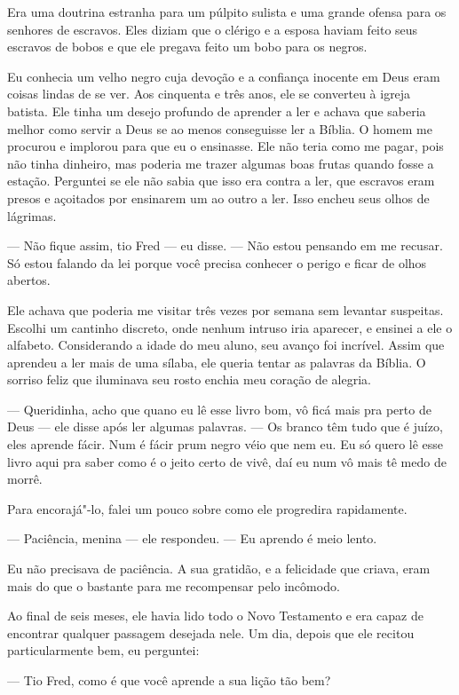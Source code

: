 Era uma doutrina estranha para um púlpito sulista e uma grande ofensa
para os senhores de escravos. Eles diziam que o clérigo e a esposa
haviam feito seus escravos de bobos e que ele pregava feito um bobo para
os negros.

Eu conhecia um velho negro cuja devoção
e a confiança inocente em Deus eram coisas lindas de se ver. Aos
cinquenta e três anos, ele se converteu à igreja batista. Ele tinha um
desejo profundo de aprender a ler e achava que saberia melhor como
servir a Deus se ao menos conseguisse ler a Bíblia. O homem me procurou
e implorou para que eu o ensinasse. Ele não teria como me pagar, pois
não tinha dinheiro, mas poderia me trazer algumas boas frutas quando
fosse a estação. Perguntei se ele não sabia que isso era contra a ler,
que escravos eram presos e açoitados por ensinarem um ao outro a ler.
Isso encheu seus olhos de lágrimas.

--- Não fique assim, tio Fred --- eu disse. --- Não estou pensando em me
recusar. Só estou falando da lei porque você precisa conhecer o perigo e
ficar de olhos abertos.

Ele achava que poderia me visitar três vezes por semana sem levantar
suspeitas. Escolhi um cantinho discreto, onde nenhum intruso iria
aparecer, e ensinei a ele o alfabeto. Considerando a idade do meu aluno,
seu avanço foi incrível. Assim que aprendeu a ler mais de uma sílaba,
ele queria tentar as palavras da Bíblia. O sorriso feliz que iluminava
seu rosto enchia meu coração de alegria.

--- Queridinha, acho que quano eu lê esse livro bom, vô ficá mais pra
perto de Deus --- ele disse após ler algumas palavras. --- Os branco têm
tudo que é juízo, eles aprende fácir. Num é fácir prum negro véio que
nem eu. Eu só quero lê esse livro aqui pra saber como é o jeito certo de
vivê, daí eu num vô mais tê medo de morrê.

Para encorajá"-lo, falei um pouco sobre
como ele progredira rapidamente.

--- Paciência, menina --- ele respondeu. --- Eu aprendo é meio lento.

Eu não precisava de paciência. A sua
gratidão, e a felicidade que criava, eram mais do que o bastante para me
recompensar pelo incômodo.

Ao final de seis meses, ele havia lido
todo o Novo Testamento e era capaz de encontrar qualquer passagem
desejada nele. Um dia, depois que ele recitou particularmente bem, eu
perguntei:

--- Tio Fred, como é que você aprende a sua lição tão bem?

